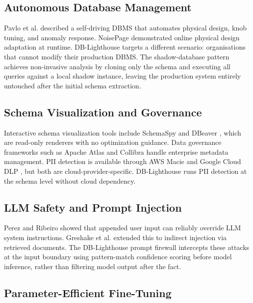 \documentclass[conference]{IEEEtran}
\begin{document}
\subsection{Autonomous Database Management}

Pavlo et al. \cite{pavlo2017selfdriving} described a self-driving DBMS that
automates physical design, knob tuning, and anomaly response. NoisePage
\cite{ma2021noisepage} demonstrated online physical design adaptation at
runtime. DB-Lighthouse targets a different scenario: organisations that
cannot modify their production DBMS. The shadow-database pattern achieves
non-invasive analysis by cloning only the schema and executing all queries
against a local shadow instance, leaving the production system entirely
untouched after the initial schema extraction.

\subsection{Schema Visualization and Governance}

Interactive schema visualization tools include SchemaSpy
\cite{schemaspy2022} and DBeaver \cite{dbeaver2023}, which are read-only
renderers with no optimization guidance. Data governance frameworks such as
Apache Atlas \cite{atlas2023} and Collibra \cite{collibra2023} handle
enterprise metadata management. PII detection is available through AWS
Macie \cite{macie2023} and Google Cloud DLP \cite{clouddlp2023}, but both
are cloud-provider-specific. DB-Lighthouse runs PII detection at the schema
level without cloud dependency.

\subsection{LLM Safety and Prompt Injection}

Perez and Ribeiro \cite{perez2022ignore} showed that appended user input
can reliably override LLM system instructions. Greshake et al.
\cite{greshake2023indirect} extended this to indirect injection via
retrieved documents. The DB-Lighthouse prompt firewall intercepts these
attacks at the input boundary using pattern-match confidence scoring before
model inference, rather than filtering model output after the fact.

\subsection{Parameter-Efficient Fine-Tuning}
\end{document}

